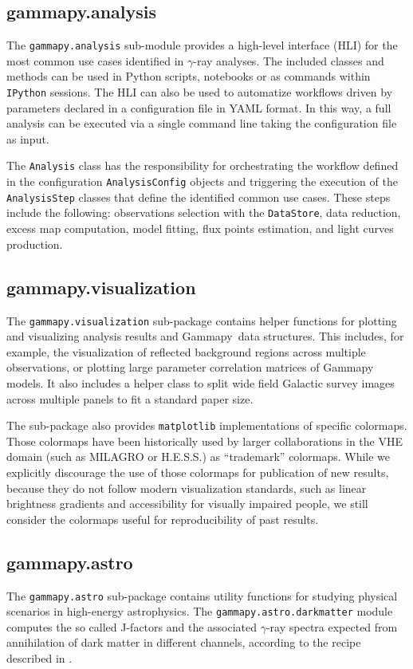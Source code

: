 \documentclass[longauth]{aa}
\newcommand{\code}[1]{\texttt{#1}}
\newcommand{\gammapy}{Gammapy\xspace}
\newcommand{\hess}{H.E.S.S.\xspace}
\newcommand{\gammaray}{$\gamma$-ray\xspace}
\newcommand{\milagro}{MILAGRO\xspace}
\begin{document}
\subsection{gammapy.analysis}
\label{ssec:gammapy-analysis}
The \code{gammapy.analysis} sub-module provides a high-level interface (HLI) for the most
common use cases identified in \gammaray analyses. The included classes and methods
 can be used in Python scripts, notebooks or as commands within \texttt{IPython}
sessions. The HLI can also be used to automatize
workflows driven by parameters declared in a configuration file in YAML format.
In this way, a full analysis can be executed via a single command line taking the
configuration file as input.

The \code{Analysis} class has the responsibility for orchestrating the workflow
defined in the configuration \code{AnalysisConfig} objects and triggering the execution of
the \code{AnalysisStep} classes that define the identified common use cases. These
steps include the following: observations selection with the \code{DataStore},  data
reduction, excess map computation, model fitting, flux points estimation, and
light curves production.

\subsection{gammapy.visualization}
\label{ssec:gammapy-visualization}
The \code{gammapy.visualization} sub-package contains helper functions
for plotting and visualizing analysis results and \gammapy~data structures.
This includes, for example, the visualization of reflected background regions across
multiple observations, or plotting large parameter correlation matrices of
\gammapy models. It also includes a helper class to split
wide field Galactic survey images across multiple panels to fit a standard
paper size.

The sub-package also provides \texttt{matplotlib} implementations of specific
colormaps. Those colormaps have been historically used by larger collaborations
in the VHE domain (such as \milagro or \hess) as \enquote{trademark}
colormaps. While we explicitly discourage the use of those colormaps for publication
of new results, because they do not follow modern visualization
standards, such as linear brightness gradients and accessibility
for visually impaired people, we still consider the colormaps
useful for reproducibility of past results.

\subsection{gammapy.astro}
\label{ssec:gammapy-astro}
The \code{gammapy.astro} sub-package contains utility functions for studying physical
scenarios in high-energy astrophysics. The \code{gammapy.astro.darkmatter} module
computes the so called J-factors and the associated \gammaray spectra expected
from annihilation of dark matter in different channels, according to the recipe
described in \cite{2011JCAP...03..051C}.
\end{document}
